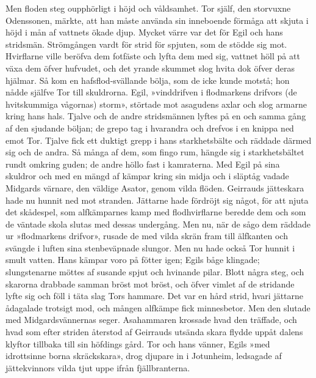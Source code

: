 Men floden steg oupphörligt i höjd och våldsamhet. Tor själf, den
storvuxne Odenssonen, märkte, att han måste använda sin inneboende
förmåga att skjuta i höjd i mån af vattnets ökade djup. Mycket värre var
det för Egil och hans stridsmän. Strömgången vardt för strid för
spjuten, som de stödde sig mot. Hvirflarne ville beröfva dem fotfäste
och lyfta dem med sig, vattnet höll på att växa dem öfver hufvudet, och
det yrande skummet slog hvita dok öfver deras hjälmar. Så kom en
hafsflod-svällande bölja, som de icke kunde motstå; hon nådde själfve
Tor till skuldrorna. Egil, »vinddrifven i flodmarkens drifvors (de
hvitskummiga vågornas) storm», störtade mot asagudens axlar och slog
armarne kring hans hals. Tjalve och de andre stridsmännen lyftes på en
och samma gång af den sjudande böljan; de grepo tag i hvarandra och
drefvos i en knippa ned emot Tor. Tjalve fick ett duktigt grepp i hans
starkhetsbälte och räddade därmed sig och de andra. Så många af dem, som
fingo rum, hängde sig i starkhetsbältet rundt omkring guden; de andre
höllo fast i kamraterna. Med Egil på sina skuldror och med en mängd af
kämpar kring sin midja och i släptåg vadade Midgards värnare, den
väldige Asator, genom vilda flöden. Geirrauds jätteskara hade nu hunnit
ned mot stranden. Jättarne hade fördröjt sig något, för att njuta det
skådespel, som alfkämparnes kamp med flodhvirflarne beredde dem och som
de väntade skola slutas med dessas undergång. Men nu, när de sågo dem
räddade ur »flodmarkens drifvor», rusade de med vilda skrän fram till
älfkanten och svängde i luften sina stenbeväpnade slungor. Men nu hade
också Tor hunnit i smult vatten. Hans kämpar voro på fötter igen; Egils
båge klingade; slungstenarne möttes af susande spjut och hvinande pilar.
Blott några steg, och skarorna drabbade samman bröst mot bröst, och
öfver vimlet af de stridande lyfte sig och föll i täta slag Tors
hammare. Det var en hård strid, hvari jättarne
ådagalade
trotsigt mod, och mången alfkämpe fick minnesbetor. Men den slutade med
Midgardsvännernas seger. Asahammaren krossade hvad den träffade, och
hvad som efter striden återstod af Geirrauds utsända skara flydde uppåt
dalens klyftor tillbaka till sin höfdings gård. Tor och hans vänner,
Egils »med idrottsinne borna skräckskara», drog djupare in i Jotunheim,
ledsagade af jättekvinnors vilda tjut uppe ifrån fjällbranterna.

